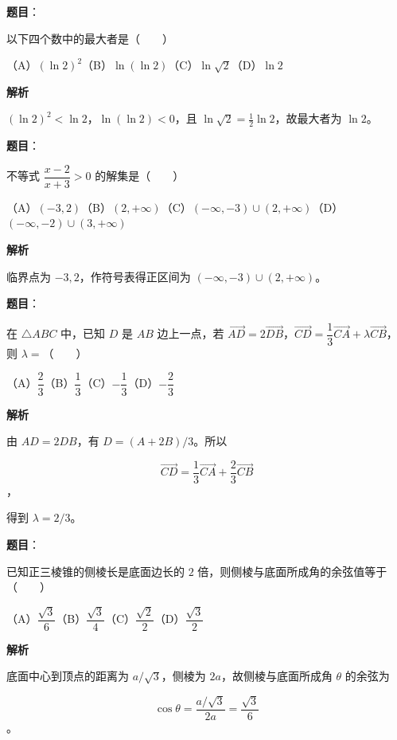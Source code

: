 \begin{answer}

\textbf{题目}：

以下四个数中的最大者是\mbox{（　　）}

（A）$(\ln2)^2$\quad（B）$\ln(\ln2)$\quad（C）$\ln\sqrt2$\quad（D）$\ln2$

\textbf{解析}

$(\ln2)^2<\ln2$，$\ln(\ln2)<0$，且 $\ln\sqrt2=\frac12\ln2$，故最大者为 $\ln2$。


\end{answer}
\begin{answer}

\textbf{题目}：

不等式 $\dfrac{x-2}{x+3}>0$ 的解集是\mbox{（　　）}

（A）$(-3,2)$\quad（B）$(2,+\infty)$\quad（C）$(-\infty,-3)\cup(2,+\infty)$\quad（D）$(-\infty,-2)\cup(3,+\infty)$

\textbf{解析}

临界点为 $-3,2$，作符号表得正区间为 $(-\infty,-3)\cup(2,+\infty)$。


\end{answer}
\begin{answer}

\textbf{题目}：

在 $\triangle ABC$ 中，已知 $D$ 是 $AB$ 边上一点，若 $\overrightarrow{AD}=2\overrightarrow{DB}$，$\overrightarrow{CD}=\dfrac13\overrightarrow{CA}+\lambda\overrightarrow{CB}$，则 $\lambda=$\mbox{（　　）}

（A）$\dfrac23$\quad（B）$\dfrac13$\quad（C）$-\dfrac13$\quad（D）$-\dfrac23$

\textbf{解析}

由 $AD=2DB$，有 $D=(A+2B)/3$。所以

\nopagebreak[4]
\[
\overrightarrow{CD}=\frac13\overrightarrow{CA}+\frac23\overrightarrow{CB}
\]
，

得到 $\lambda=2/3$。


\end{answer}
\begin{answer}

\textbf{题目}：

已知正三棱锥的侧棱长是底面边长的 $2$ 倍，则侧棱与底面所成角的余弦值等于\mbox{（　　）}

（A）$\dfrac{\sqrt3}{6}$\quad（B）$\dfrac{\sqrt3}{4}$\quad（C）$\dfrac{\sqrt2}{2}$\quad（D）$\dfrac{\sqrt3}{2}$

\textbf{解析}

底面中心到顶点的距离为 $a/\sqrt3$，侧棱为 $2a$，故侧棱与底面所成角 $\theta$ 的余弦为

\nopagebreak[4]
\[
\cos\theta=\frac{a/\sqrt3}{2a}=\frac{\sqrt3}{6}
\]
。


\end{answer}

